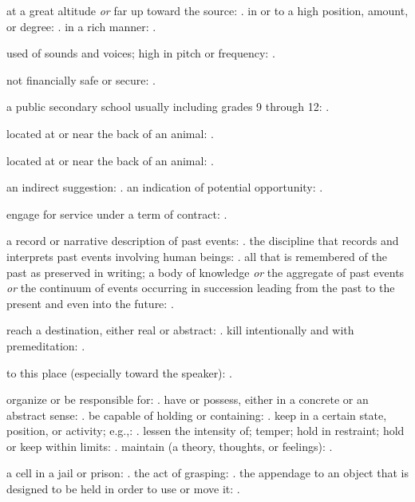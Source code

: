   at a great altitude \textit{or} far up toward the source: . in or to a high position, amount, or degree: . in a rich manner: .

  used of sounds and voices; high in pitch or frequency: .

  not financially safe or secure: .

  a public secondary school usually including grades 9 through 12: .

  located at or near the back of an animal: .

  located at or near the back of an animal: .

  an indirect suggestion: . an indication of potential opportunity: .

  engage for service under a term of contract: .

  a record or narrative description of past events: . the discipline that records and interprets past events involving human beings: . all that is remembered of the past as preserved in writing; a body of knowledge \textit{or} the aggregate of past events \textit{or} the continuum of events occurring in succession leading from the past to the present and even into the future: .

  reach a destination, either real or abstract: . kill intentionally and with premeditation: .

  to this place (especially toward the speaker): .

  organize or be responsible for: . have or possess, either in a concrete or an abstract sense: . be capable of holding or containing: . keep in a certain state, position, or activity; e.g.,: . lessen the intensity of; temper; hold in restraint; hold or keep within limits: . maintain (a theory, thoughts, or feelings): .

  a cell in a jail or prison: . the act of grasping: . the appendage to an object that is designed to be held in order to use or move it: .

